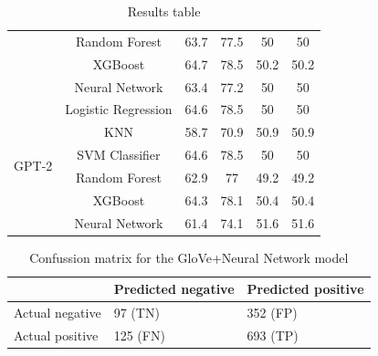 \begin{table}[htb]
\begin{tabular}{l|c|c|c|c|c}
    & Random Forest &       63.7 &       77.5 &                50   &      50   \\
    & XGBoost &       64.7 &       78.5 &                50.2 &      50.2 \\
    & Neural Network &       63.4 &       77.2 &                50   &      50   \\
\hline
\multirow{6}{*}{GPT-2} 
    & Logistic Regression &       64.6 &       78.5 &                50   &      50   \\
    & KNN &       58.7 &       70.9 &                50.9 &      50.9 \\
    & SVM Classifier &       64.6 &       78.5 &                50   &      50   \\
    & Random Forest &       62.9 &       77   &                49.2 &      49.2 \\
    & XGBoost &       64.3 &       78.1 &                50.4 &      50.4 \\
    & Neural Network &       61.4 &       74.1 &                51.6 &      51.6 \\
\hline
\end{tabular}
\caption{Results table}
\label{results_table}
\end{table}



\begin{table}[htb]
\centering
{
\makegapedcells
\begin{tabular}{lll}
                & Predicted negative & Predicted positive \\
\hline
Actual negative & 97 (TN)           & 352 (FP) \\
Actual positive & 125 (FN)           & 693 (TP) \\
\hline
\end{tabular}
}
\caption{Confussion matrix for the GloVe+Neural Network model}
\label{glovenn_cm}
\end{table}